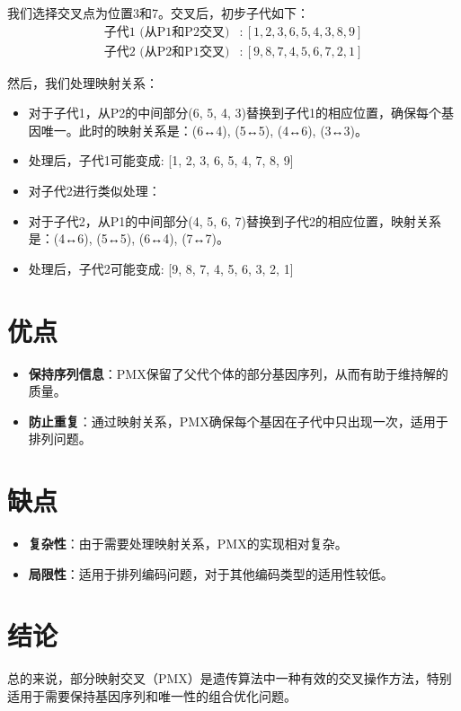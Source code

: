 \documentclass{article}
\begin{document}
我们选择交叉点为位置3和7。交叉后，初步子代如下：
\begin{align*}
\text{子代1 (从P1和P2交叉)} &: [1, 2, 3, 6, 5, 4, 3, 8, 9] \\
\text{子代2 (从P2和P1交叉)} &: [9, 8, 7, 4, 5, 6, 7, 2, 1]
\end{align*}

然后，我们处理映射关系：
\begin{itemize}
    \item 对于子代1，从P2的中间部分(6, 5, 4, 3)替换到子代1的相应位置，确保每个基因唯一。此时的映射关系是：(6↔4), (5↔5), (4↔6), (3↔3)。
    \item 处理后，子代1可能变成: [1, 2, 3, 6, 5, 4, 7, 8, 9]
    \item 对子代2进行类似处理：
    \item 对于子代2，从P1的中间部分(4, 5, 6, 7)替换到子代2的相应位置，映射关系是：(4↔6), (5↔5), (6↔4), (7↔7)。
    \item 处理后，子代2可能变成: [9, 8, 7, 4, 5, 6, 3, 2, 1]
\end{itemize}

\section*{优点}
\begin{itemize}
    \item \textbf{保持序列信息}：PMX保留了父代个体的部分基因序列，从而有助于维持解的质量。
    \item \textbf{防止重复}：通过映射关系，PMX确保每个基因在子代中只出现一次，适用于排列问题。
\end{itemize}

\section*{缺点}
\begin{itemize}
    \item \textbf{复杂性}：由于需要处理映射关系，PMX的实现相对复杂。
    \item \textbf{局限性}：适用于排列编码问题，对于其他编码类型的适用性较低。
\end{itemize}

\section*{结论}
总的来说，部分映射交叉（PMX）是遗传算法中一种有效的交叉操作方法，特别适用于需要保持基因序列和唯一性的组合优化问题。
\end{document}
